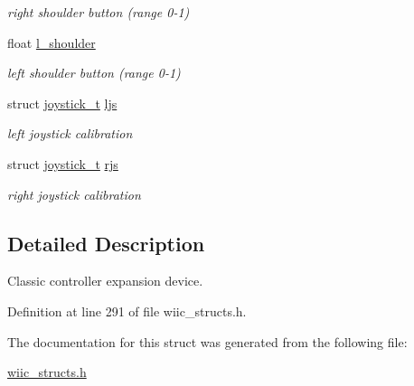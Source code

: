 \begin{DoxyCompactItemize}
\begin{DoxyCompactList}\small\item\em right shoulder button (range 0-\/1) \end{DoxyCompactList}\item 
\hypertarget{structclassic__ctrl__t_a81ab6316018923d2cc7ae436be5a46f1}{float \hyperlink{structclassic__ctrl__t_a81ab6316018923d2cc7ae436be5a46f1}{l\-\_\-shoulder}}\label{structclassic__ctrl__t_a81ab6316018923d2cc7ae436be5a46f1}

\begin{DoxyCompactList}\small\item\em left shoulder button (range 0-\/1) \end{DoxyCompactList}\item 
\hypertarget{structclassic__ctrl__t_a0fb0ee68b85831de93dffc5238bb87e0}{struct \hyperlink{structjoystick__t}{joystick\-\_\-t} \hyperlink{structclassic__ctrl__t_a0fb0ee68b85831de93dffc5238bb87e0}{ljs}}\label{structclassic__ctrl__t_a0fb0ee68b85831de93dffc5238bb87e0}

\begin{DoxyCompactList}\small\item\em left joystick calibration \end{DoxyCompactList}\item 
\hypertarget{structclassic__ctrl__t_aa27c616f6e84b2ca93e2a42bb7744fc8}{struct \hyperlink{structjoystick__t}{joystick\-\_\-t} \hyperlink{structclassic__ctrl__t_aa27c616f6e84b2ca93e2a42bb7744fc8}{rjs}}\label{structclassic__ctrl__t_aa27c616f6e84b2ca93e2a42bb7744fc8}

\begin{DoxyCompactList}\small\item\em right joystick calibration \end{DoxyCompactList}\end{DoxyCompactItemize}


\subsection{Detailed Description}
Classic controller expansion device. 

Definition at line 291 of file wiic\-\_\-structs.\-h.



The documentation for this struct was generated from the following file\-:\begin{DoxyCompactItemize}
\item 
\hyperlink{wiic__structs_8h}{wiic\-\_\-structs.\-h}\end{DoxyCompactItemize}
